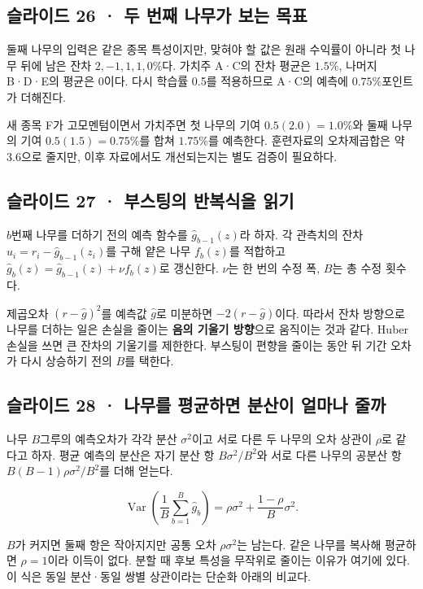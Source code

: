 \documentclass[11pt,a4paper]{article}
\begin{document}
\subsection{슬라이드 26 · 두 번째 나무가 보는 목표}
둘째 나무의 입력은 같은 종목 특성이지만, 맞혀야 할 값은 원래 수익률이 아니라 첫 나무 뒤에 남은 잔차 $2,-1,1,1,0\%$다. 가치주 A·C의 잔차 평균은 $1.5\%$, 나머지 B·D·E의 평균은 0이다. 다시 학습률 0.5를 적용하므로 A·C의 예측에 $0.75\%$포인트가 더해진다.\par

새 종목 F가 고모멘텀이면서 가치주면 첫 나무의 기여 $0.5(2.0)=1.0\%$와 둘째 나무의 기여 $0.5(1.5)=0.75\%$를 합쳐 $1.75\%$를 예측한다. 훈련자료의 오차제곱합은 약 3.6으로 줄지만, 이후 자료에서도 개선되는지는 별도 검증이 필요하다.\par

\subsection{슬라이드 27 · 부스팅의 반복식을 읽기}
$b$번째 나무를 더하기 전의 예측 함수를 $\hat g_{b-1}(z)$라 하자. 각 관측치의 잔차 $u_i=r_i-\hat g_{b-1}(z_i)$를 구해 얕은 나무 $f_b(z)$를 적합하고 $\hat g_b(z)=\hat g_{b-1}(z)+\nu f_b(z)$로 갱신한다. $\nu$는 한 번의 수정 폭, $B$는 총 수정 횟수다.\par

제곱오차 $(r-\hat g)^2$를 예측값 $\hat g$로 미분하면 $-2(r-\hat g)$이다. 따라서 잔차 방향으로 나무를 더하는 일은 손실을 줄이는 \textbf{음의 기울기 방향}으로 움직이는 것과 같다. Huber 손실을 쓰면 큰 잔차의 기울기를 제한한다. 부스팅이 편향을 줄이는 동안 뒤 기간 오차가 다시 상승하기 전의 $B$를 택한다.\par

\subsection{슬라이드 28 · 나무를 평균하면 분산이 얼마나 줄까}
나무 $B$그루의 예측오차가 각각 분산 $\sigma^2$이고 서로 다른 두 나무의 오차 상관이 $\rho$로 같다고 하자. 평균 예측의 분산은 자기 분산 항 $B\sigma^2/B^2$와 서로 다른 나무의 공분산 항 $B(B-1)\rho\sigma^2/B^2$를 더해 얻는다.\par

\[
\operatorname{Var}\!\left(\frac1B\sum_{b=1}^{B}\hat g_b\right)
=\rho\sigma^2+\frac{1-\rho}{B}\sigma^2.
\]

$B$가 커지면 둘째 항은 작아지지만 공통 오차 $\rho\sigma^2$는 남는다. 같은 나무를 복사해 평균하면 $\rho=1$이라 이득이 없다. 분할 때 후보 특성을 무작위로 줄이는 이유가 여기에 있다. 이 식은 동일 분산·동일 쌍별 상관이라는 단순화 아래의 비교다.\par
\end{document}
